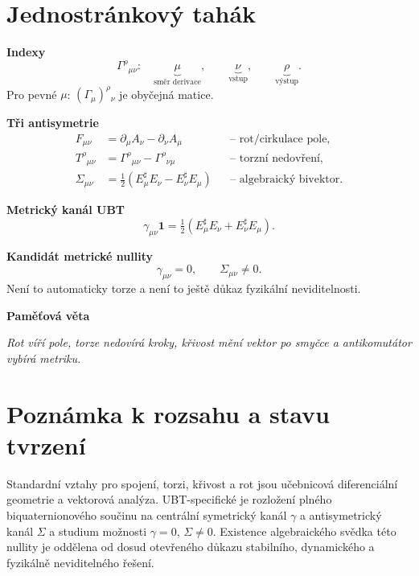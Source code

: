 \section{Jednostránkový tahák}

\begin{cheatbox}
\textbf{Indexy}
\[
  \Gamma^\rho{}_{\mu\nu}:
  \quad
  \underbrace{\mu}_{\text{směr derivace}},\qquad
  \underbrace{\nu}_{\text{vstup}},\qquad
  \underbrace{\rho}_{\text{výstup}}.
\]
Pro pevné $\mu$: $(\Gamma_\mu)^\rho{}_{\nu}$ je obyčejná matice.

\medskip
\textbf{Tři antisymetrie}
\[
\begin{aligned}
F_{\mu\nu}&=\partial_\mu A_\nu-\partial_\nu A_\mu
&&\text{-- rot/cirkulace pole},\\
T^\rho{}_{\mu\nu}&=\Gamma^\rho{}_{\mu\nu}-\Gamma^\rho{}_{\nu\mu}
&&\text{-- torzní nedovření},\\
\Sigma_{\mu\nu}&=\tfrac12(E_\mu^\sharp E_\nu-E_\nu^\sharp E_\mu)
&&\text{-- algebraický bivektor}.
\end{aligned}
\]

\textbf{Metrický kanál UBT}
\[
  \gamma_{\mu\nu}\mathbf1
  =\tfrac12(E_\mu^\sharp E_\nu+E_\nu^\sharp E_\mu).
\]

\textbf{Kandidát metrické nullity}
\[
  \gamma_{\mu\nu}=0,\qquad \Sigma_{\mu\nu}\neq0.
\]
Není to automaticky torze a není to ještě důkaz fyzikální neviditelnosti.

\medskip
\textbf{Paměťová věta}
\begin{center}
\emph{Rot víří pole, torze nedovírá kroky, křivost mění vektor po smyčce a
antikomutátor vybírá metriku.}
\end{center}
\end{cheatbox}

\section*{Poznámka k rozsahu a stavu tvrzení}
Standardní vztahy pro spojení, torzi, křivost a rot jsou učebnicová diferenciální
geometrie a vektorová analýza. UBT-specifické je rozložení plného
biquaternionového součinu na centrální symetrický kanál $\gamma$ a
antisymetrický kanál $\Sigma$ a studium možnosti $\gamma=0$, $\Sigma\neq0$.
Existence algebraického svědka této nullity je oddělena od dosud otevřeného
důkazu stabilního, dynamického a fyzikálně neviditelného řešení.

